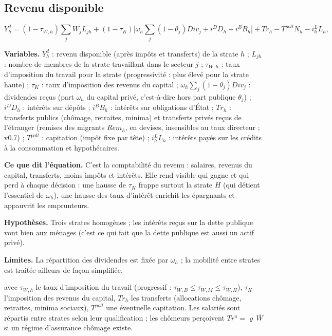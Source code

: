 \documentclass[11pt,a4paper]{article}
\newcommand{\variables}{\par\noindent\textbf{Variables.} }
\newcommand{\sens}{\par\noindent\textbf{Ce que dit l'équation.} }
\newcommand{\hyp}{\par\noindent\textbf{Hypothèses.} }
\newcommand{\limites}{\par\noindent\textbf{Limites.} }
\begin{document}
\subsection{Revenu disponible}
\begin{equation}
Y^d_h = (1-\tau_{W,h}) \sum_j W_j L_{jh} + (1-\tau_{K}) \big[\omega_h \textstyle\sum_j (1-\theta_j) Div_j + i^D D_h + i^B B_h\big] + Tr_h - T^{poll} N_h - i^{L}_h L_h ,
\label{eq:yd}
\end{equation}
\begin{lecture}
\variables $Y^d_h$ : revenu disponible (après impôts et transferts) de la strate $h$ ; $L_{jh}$ : nombre de membres de la strate travaillant dans le secteur $j$ ; $\tau_{W,h}$ : taux d'imposition du travail pour la strate (progressivité : plus élevé pour la strate haute) ; $\tau_K$ : taux d'imposition des revenus du capital ; $\omega_h\sum_j(1-\theta_j)Div_j$ : dividendes reçus (part $\omega_h$ du capital privé, c'est-à-dire hors part publique $\theta_j$) ; $i^D D_h$ : intérêts sur dépôts ; $i^B B_h$ : intérêts sur obligations d'État ; $Tr_h$ : transferts publics (chômage, retraites, minima) et transferts privés reçus de l'étranger (remises des migrants $Rem_h$, en devises, insensibles au taux directeur ; v0.7) ; $T^{poll}$ : capitation (impôt fixe par tête) ; $i^L_h L_h$ : intérêts payés sur les crédits à la consommation et hypothécaires.
\sens C'est la comptabilité du revenu : salaires, revenus du capital, transferts, moins impôts et intérêts. Elle rend visible qui gagne et qui perd à chaque décision : une hausse de $\tau_K$ frappe surtout la strate $H$ (qui détient l'essentiel de $\omega_h$), une hausse des taux d'intérêt enrichit les épargnants et appauvrit les emprunteurs.
\hyp Trois strates homogènes ; les intérêts reçus sur la dette publique vont bien aux ménages (c'est ce qui fait que la dette publique est aussi un actif privé).
\limites La répartition des dividendes est fixée par $\omega_h$ ; la mobilité entre strates est traitée ailleurs de façon simplifiée.
\end{lecture}
avec $\tau_{W,h}$ le taux d'imposition du travail (progressif : $\tau_{W,B} \le \tau_{W,M} \le \tau_{W,H}$), $\tau_K$ l'imposition des revenus du capital, $Tr_h$ les transferts (allocations chômage, retraites, minima sociaux), $T^{poll}$ une éventuelle capitation. Les salariés sont répartis entre strates selon leur qualification ; les chômeurs perçoivent $Tr^{u} = \varrho\, \bar W$ si un régime d'assurance chômage existe.
\end{document}
